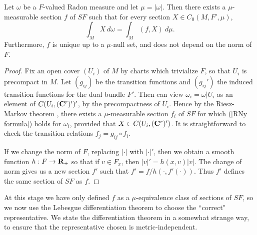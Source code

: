 \begin{proposition}\label{HanhJordan}
Let $\omega$ be a $F$-valued Radon measure and let $\mu = |\omega|$.
Then there exists a $\mu$-measurable section $f$ of $SF$ such that for every section $X \in C_0(M, F', \mu)$,
\begin{equation}\label{RNy formula}
\int_M X ~d\omega = \int_M (f, X) ~d\mu.
\end{equation}
Furthermore, $f$ is unique up to a $\mu$-null set, and does not depend on the norm of $F$.
\end{proposition}
\begin{proof}
Fix an open cover $(U_i)$ of $M$ by charts which trivialize $F$, so that $U_i$ is precompact in $M$.
Let $(g_{ij})$ be the transition functions and $(g_{ij}')$ the induced transition functions for the dual bundle $F'$.
Then can view $\omega_i = \omega|U_i$ as an element of $C(U_i, (\mathbf{C}^r)')'$, by the precompactness of $U_i$.
Hence by the Riesz-Markov theorem \cite[Theorem 4.14]{simon1983GMT}, there exists a $\mu$-measurable section $f_i$ of $SF$ for which (\ref{RNy formula}) holds for $\omega_i$, provided that $X \in C(U_i, (\mathbf{C}^r)')$.
It is straightforward to check the transition relations $f_j = g_{ij} \circ f_i$.


If we change the norm of $F$, replacing $|\cdot|$ with $|\cdot|'$, then we obtain a smooth function $h: F \to \mathbf{R}_+$ so that if $v \in F_x$, then $|v|' = h(x, v)|v|$.
The change of norm gives us a new section $f'$ such that $f' = f/h(\cdot, f'(\cdot))$.
Thus $f'$ defines the same section of $SF$ as $f$.
\end{proof}

At this stage we have only defined $f$ as a $\mu$-equivalence class of sections of $SF$, so we now use the Lebesgue differentiation theorem to choose the ``correct" representative.
We state the differentiation theorem in a somewhat strange way, to ensure that the representative chosen is metric-independent.

